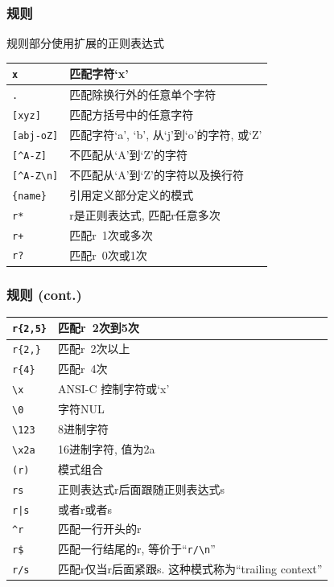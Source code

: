 \documentclass[compress]{beamer}
\begin{document}
\begin{frame}[containsverbatim]
\frametitle{规则}
规则部分使用扩展的正则表达式\\[1ex]
{\footnotesize
\begin{tabular}{|l|p{8cm}|}\hline
\verb~x~ & 匹配字符`x' \\ \hline
\verb~.~ & 匹配除换行外的任意单个字符 \\ \hline
\verb~[xyz]~ & 匹配方括号中的任意字符 \\ \hline
\verb~[abj-oZ]~ & 匹配字符`a', `b', 从`j'到`o'的字符, 或`Z' \\ \hline
\verb~[^A-Z]~ & 不匹配从`A'到`Z'的字符 \\ \hline
\verb~[^A-Z\n]~ & 不匹配从`A'到`Z'的字符以及换行符 \\ \hline\hline
\verb~{name}~ & 引用定义部分定义的模式 \\ \hline
\verb~r*~ & r是正则表达式, 匹配r任意多次 \\ \hline
\verb~r+~ & 匹配r~1次或多次 \\ \hline
\verb~r?~ & 匹配r~0次或1次 \\ \hline
\end{tabular}
}

\end{frame}

\begin{frame}[containsverbatim]
\frametitle{规则 (cont.)}

{\footnotesize
\begin{tabular}{|l|l|}\hline

\verb~r{2,5}~ & 匹配r~2次到5次 \\ \hline
\verb~r{2,}~ & 匹配r~2次以上 \\ \hline
\verb~r{4}~ & 匹配r~4次 \\ \hline
\verb~\x~ & ANSI-C 控制字符或`x' \\ \hline
\verb~\0~ & 字符NUL \\ \hline
\verb~\123~ & 8进制字符 \\ \hline
\verb~\x2a~ & 16进制字符, 值为2a \\ \hline
\verb~(r)~ & 模式组合 \\ \hline
\verb~rs~ & 正则表达式r后面跟随正则表达式s\\ \hline
\verb~r|s~ & 或者r或者s \\ \hline
\verb~^r~ & 匹配一行开头的r \\ \hline
\verb~r$~ & 匹配一行结尾的r, 等价于``\verb~r/\n~'' \\ \hline
\verb~r/s~ & 匹配r仅当r后面紧跟s. 这种模式称为``trailing context'' \\ \hline
\end{tabular}
}

\end{frame}
\end{document}
